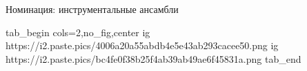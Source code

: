  
 
 
 
 

Номинация: инструментальные ансамбли

\ifcmt
tab_begin cols=2,no_fig,center
  ig https://i2.paste.pics/4006a20a55abdb4e5e43ab293cacee50.png
	ig https://i2.paste.pics/bc4fe0f38b25f4ab39ab49ae6f45831a.png
tab_end
\fi
